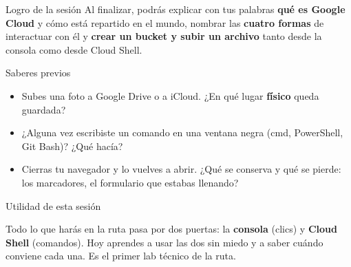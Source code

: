 \documentclass[aspectratio=169,10pt,c]{beamer}
\begin{document}
\begin{frame}[c]
\begin{block}{Logro de la sesión}
Al finalizar, podrás explicar con tus palabras \textbf{qué es Google Cloud} y cómo está repartido en el mundo, nombrar las \textbf{cuatro formas} de interactuar con él y \textbf{crear un bucket y subir un archivo} tanto desde la consola como desde Cloud Shell.
\end{block}
\end{frame}

\begin{frame}{Saberes previos}
\begin{itemize}\setlength\itemsep{10pt}
  \item Subes una foto a Google Drive o a iCloud. ¿En qué lugar \textbf{físico} queda guardada?
  \item ¿Alguna vez escribiste un comando en una ventana negra (cmd, PowerShell, Git Bash)? ¿Qué hacía?
  \item Cierras tu navegador y lo vuelves a abrir. ¿Qué se conserva y qué se pierde: los marcadores, el formulario que estabas llenando?
\end{itemize}
\end{frame}

\begin{frame}[c]{Utilidad de esta sesión}
\begin{center}
\begin{minipage}{.86\textwidth}
{\large Todo lo que harás en la ruta pasa por dos puertas: la \textbf{consola} (clics) y \textbf{Cloud Shell} (comandos). Hoy aprendes a usar las dos sin miedo y a saber cuándo conviene cada una. Es el primer lab técnico de la ruta.}
\end{minipage}
\end{center}
\end{frame}
\end{document}
